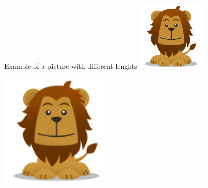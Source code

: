 \documentclass{article}
\begin{document}
Example of a picture with different lenghts
\includegraphics[width=15ex]{lion-logo}
 
\includegraphics[width=15em]{lion-logo}
\end{document}

